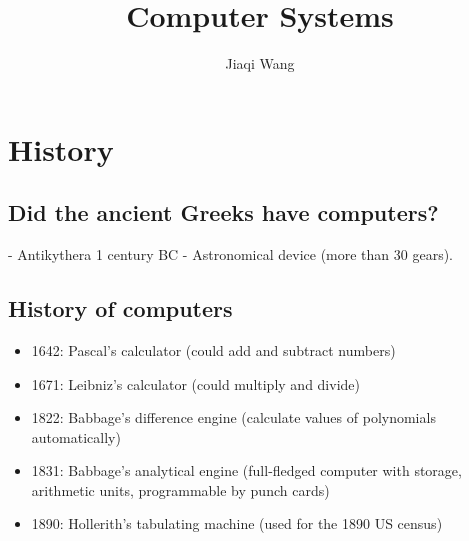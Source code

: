 \documentclass{classnotes}
\author{Jiaqi Wang}
\title{Computer Systems}
\begin{document}
\maketitle



























\section{History}
\subsection{Did the ancient Greeks have computers?}
- Antikythera 1 century BC - Astronomical device (more than 30 gears).
\subsection{History of computers}
\begin{itemize}
    \item 1642: Pascal's calculator (could add and subtract numbers)
    \item 1671: Leibniz's calculator (could multiply and divide)
    \item 1822: Babbage's difference engine (calculate values of polynomials automatically)
    \item 1831: Babbage's analytical engine (full-fledged computer with storage, arithmetic units, programmable by punch cards)
    \item 1890: Hollerith's tabulating machine (used for the 1890 US census)
\end{itemize}

\end{document}
